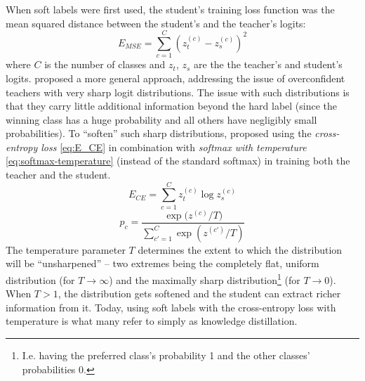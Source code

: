 \documentclass[bsc,frontabs,twoside,singlespacing,parskip,deptreport]{infthesis}
\begin{document}
{{{      When soft labels were first used, the student's training loss function was the mean squared distance between the student's and the teacher's logits:
      \begin{equation}
        E_{MSE}=\sum_{c=1}^{C}{(z_t^{(c)}-z_s^{(c)})^2}
        \label{eq:E_MSE}        
      \end{equation}
      where $C$ is the number of classes and $z_t$, $z_s$ are the the teacher's and student's logits.
      \citet{Hinton_2015} proposed a more general approach, addressing the issue of overconfident teachers with very sharp logit distributions. The issue with such distributions is that they carry little additional information beyond the hard label (since the winning class has a huge probability and all others have negligibly small probabilities).
      To ``soften'' such sharp distributions, \citeauthor{Hinton_2015} proposed using the \textit{cross-entropy loss} \autoref{eq:E_CE} in combination with \textit{softmax with temperature} \autoref{eq:softmax-temperature} (instead of the standard softmax) in training both the teacher and the student.
      \begin{equation}
        E_{CE}=\sum_{c=1}^{C}{z_t^{(c)} \log{z_s^{(c)}}}
        \label{eq:E_CE}        
      \end{equation}
      \begin{equation}
        p_c=\frac{\exp{(z^{(c)}/T})}{\sum_{c'=1}^{C}{\exp{(z^{(c')}/T)}}}
        \label{eq:softmax-temperature}        
      \end{equation}
      The temperature parameter $T$ determines the extent to which the distribution will be ``unsharpened'' -- two extremes being the completely flat, uniform distribution (for $T \rightarrow \infty$) and the maximally sharp distribution\footnote{I.e. having the preferred class's probability 1 and the other classes' probabilities 0.} (for $T \rightarrow 0$). When $T > 1$, the distribution gets softened and the student can extract richer information from it. Today, using soft labels with the cross-entropy loss with temperature is what many refer to simply as knowledge distillation.

}}}
\end{document}
